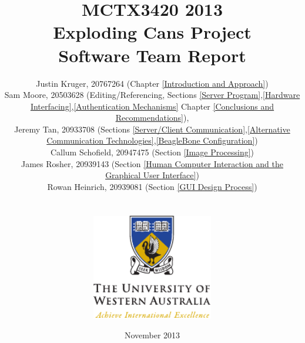\begin{titlepage}
\title{MCTX3420 2013\\Exploding Cans Project\\Software Team Report}
\author{Justin Kruger, 20767264 (Chapter \ref{Introduction and Approach})\\
		Sam Moore, 20503628 (Editing/Referencing, Sections \ref{Server Program},\ref{Hardware Interfacing},\ref{Authentication Mechanisms} Chapter \ref{Conclusions and Recommendations}), \\
		Jeremy Tan, 20933708 (Sections \ref{Server/Client Communication},\ref{Alternative Communication Technologies},\ref{BeagleBone Configuration})\\
		Callum Schofield, 20947475 (Section \ref{Image Processing})\\
		James Rosher, 20939143 (Section \ref{Human Computer Interaction and the Graphical User Interface}) \\
		Rowan Heinrich, 20939081 (Section \ref{GUI Design Process}) \\ \\ \\
		\includegraphics[width=200px]{figures/uwacrest.pdf}
}
\date{November 2013}
\maketitle
\centering
\end{titlepage}
